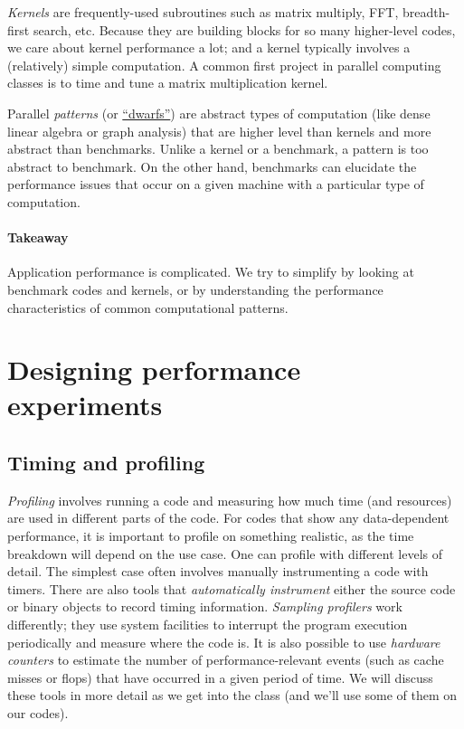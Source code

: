 \documentclass[12pt, leqno]{article} %
\begin{document}
\emph{Kernels} are frequently-used subroutines such as matrix multiply,
FFT, breadth-first search, etc. Because they are building blocks for so
many higher-level codes, we care about kernel performance a lot; and a
kernel typically involves a (relatively) simple computation. A common
first project in parallel computing classes is to time and tune a matrix
multiplication kernel.

Parallel \emph{patterns} (or
\href{www.eecs.berkeley.edu/Pubs/TechRpts/2006/EECS-2006-183.pdf}{``dwarfs''})
are abstract types of computation (like dense linear algebra or graph
analysis) that are higher level than kernels and more abstract than
benchmarks. Unlike a kernel or a benchmark, a pattern is too abstract to
benchmark. On the other hand, benchmarks can elucidate the performance
issues that occur on a given machine with a particular type of
computation.

\paragraph{Takeaway}

Application performance is complicated. We try to simplify by looking at
benchmark codes and kernels, or by understanding the performance
characteristics of common computational patterns.

\section{Designing performance experiments}

\subsection{Timing and profiling}

\emph{Profiling} involves running a code and measuring how much time
(and resources) are used in different parts of the code. For codes that
show any data-dependent performance, it is important to profile on
something realistic, as the time breakdown will depend on the use case.
One can profile with different levels of detail. The simplest case often
involves manually instrumenting a code with timers. There are also tools
that \emph{automatically instrument} either the source code or binary
objects to record timing information. \emph{Sampling profilers} work
differently; they use system facilities to interrupt the program
execution periodically and measure where the code is. It is also
possible to use \emph{hardware counters} to estimate the number of
performance-relevant events (such as cache misses or flops) that have
occurred in a given period of time. We will discuss these tools in more
detail as we get into the class (and we'll use some of them on our
codes).
\end{document}
